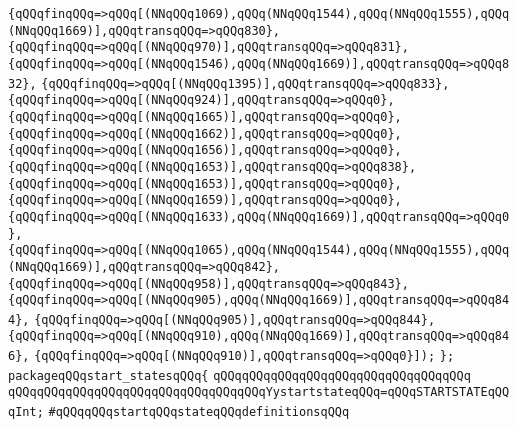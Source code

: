 \verb|{qQQqfinqQQq=>qQQq[(NNqQQq1069),qQQq(NNqQQq1544),qQQq(NNqQQq1555),qQQq(NNqQQq1669)],qQQqtransqQQq=>qQQq830},|\newline
\verb|{qQQqfinqQQq=>qQQq[(NNqQQq970)],qQQqtransqQQq=>qQQq831},|\newline
\verb|{qQQqfinqQQq=>qQQq[(NNqQQq1546),qQQq(NNqQQq1669)],qQQqtransqQQq=>qQQq832},|\newline
\verb|{qQQqfinqQQq=>qQQq[(NNqQQq1395)],qQQqtransqQQq=>qQQq833},|\newline
\verb|{qQQqfinqQQq=>qQQq[(NNqQQq924)],qQQqtransqQQq=>qQQq0},|\newline
\verb|{qQQqfinqQQq=>qQQq[(NNqQQq1665)],qQQqtransqQQq=>qQQq0},|\newline
\verb|{qQQqfinqQQq=>qQQq[(NNqQQq1662)],qQQqtransqQQq=>qQQq0},|\newline
\verb|{qQQqfinqQQq=>qQQq[(NNqQQq1656)],qQQqtransqQQq=>qQQq0},|\newline
\verb|{qQQqfinqQQq=>qQQq[(NNqQQq1653)],qQQqtransqQQq=>qQQq838},|\newline
\verb|{qQQqfinqQQq=>qQQq[(NNqQQq1653)],qQQqtransqQQq=>qQQq0},|\newline
\verb|{qQQqfinqQQq=>qQQq[(NNqQQq1659)],qQQqtransqQQq=>qQQq0},|\newline
\verb|{qQQqfinqQQq=>qQQq[(NNqQQq1633),qQQq(NNqQQq1669)],qQQqtransqQQq=>qQQq0},|\newline
\verb|{qQQqfinqQQq=>qQQq[(NNqQQq1065),qQQq(NNqQQq1544),qQQq(NNqQQq1555),qQQq(NNqQQq1669)],qQQqtransqQQq=>qQQq842},|\newline
\verb|{qQQqfinqQQq=>qQQq[(NNqQQq958)],qQQqtransqQQq=>qQQq843},|\newline
\verb|{qQQqfinqQQq=>qQQq[(NNqQQq905),qQQq(NNqQQq1669)],qQQqtransqQQq=>qQQq844},|\newline
\verb|{qQQqfinqQQq=>qQQq[(NNqQQq905)],qQQqtransqQQq=>qQQq844},|\newline
\verb|{qQQqfinqQQq=>qQQq[(NNqQQq910),qQQq(NNqQQq1669)],qQQqtransqQQq=>qQQq846},|\newline
\verb|{qQQqfinqQQq=>qQQq[(NNqQQq910)],qQQqtransqQQq=>qQQq0}]);|\newline
\verb|};|\newline
\verb|packageqQQqstart_statesqQQq{|\newline
\verb|qQQqqQQqqQQqqQQqqQQqqQQqqQQqqQQqqQQq|\newline
\verb|qQQqqQQqqQQqqQQqqQQqqQQqqQQqqQQqqQQqYystartstateqQQq=qQQqSTARTSTATEqQQqInt;|\newline
\newline
\verb|#qQQqqQQqstartqQQqstateqQQqdefinitionsqQQq|\newline
